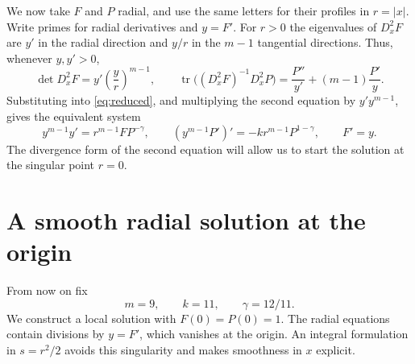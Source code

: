 \documentclass[11pt]{article}
\DeclareMathOperator{\tr}{tr}
\theoremstyle{remark}
\begin{document}
We now take $F$ and $P$ radial, and use the same letters for their
profiles in $r=|x|$.  Write primes for radial derivatives and
$y=F'$.  For $r>0$ the eigenvalues of $D_x^2F$ are $y'$ in the
radial direction and $y/r$ in the $m-1$ tangential directions.
Thus, whenever $y,y'>0$,
\[
 \det D_x^2F=y'\left(\frac yr\right)^{m-1},\qquad
 \tr\bigl((D_x^2F)^{-1}D_x^2P\bigr)
 =\frac{P''}{y'}+(m-1)\frac{P'}y.
\]
Substituting into \eqref{eq:reduced}, and multiplying the second
equation by $y'y^{m-1}$, gives the equivalent system
\begin{equation}\label{eq:radial}
 y^{m-1}y'=r^{m-1}FP^{-\gamma},\qquad
 (y^{m-1}P')'=-k r^{m-1}P^{1-\gamma},\qquad F'=y.
\end{equation}
The divergence form of the second equation will allow us to start
the solution at the singular point $r=0$.

\section{A smooth radial solution at the origin}\label{sec:local}
From now on fix
\begin{equation}\label{eq:constants}
 m=9,\qquad k=11,\qquad \gamma=12/11.
\end{equation}
We construct a local solution with $F(0)=P(0)=1$.
The radial equations contain divisions by $y=F'$, which vanishes
at the origin.  An integral formulation in $s=r^2/2$ avoids this
singularity and makes smoothness in $x$ explicit.
\end{document}
